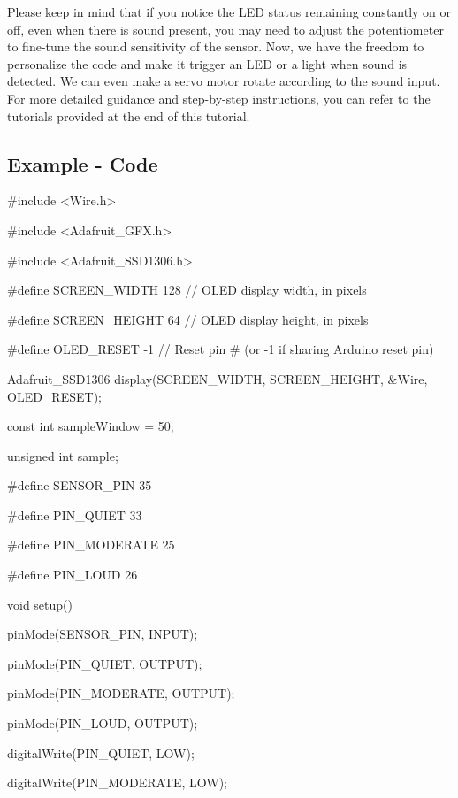 Please keep in mind that if you notice the LED status remaining constantly on or off, even when there is sound present, you may need to adjust the potentiometer to fine-tune the sound sensitivity of the sensor.
Now, we have the freedom to personalize the code and make it trigger an LED or a light when sound is detected. We can even make a servo motor rotate according to the sound input. For more detailed guidance and step-by-step instructions, you can refer to the tutorials provided at the end of this tutorial.


\subsection{Example - Code}

\begin{Arduino}
	#include <Wire.h>
	
	#include <Adafruit_GFX.h>
	
	#include <Adafruit_SSD1306.h>
	
	#define  SCREEN_WIDTH 128 // OLED display width, in pixels
	
	#define  SCREEN_HEIGHT 64 // OLED display height, in pixels
	
	#define  OLED_RESET   -1 // Reset pin # (or -1 if sharing Arduino reset pin)
	
	
	
	Adafruit_SSD1306 display(SCREEN_WIDTH, SCREEN_HEIGHT, &Wire, OLED_RESET);
	
	
	
	const int sampleWindow = 50;
	
	unsigned int sample;
	
	
	
	#define SENSOR_PIN 35
	
	#define PIN_QUIET 33
	
	#define PIN_MODERATE 25
	
	#define PIN_LOUD 26
	
	
	
	void setup(){
		
		pinMode(SENSOR_PIN, INPUT); 
		
		pinMode(PIN_QUIET, OUTPUT);
		
		pinMode(PIN_MODERATE, OUTPUT);
		
		pinMode(PIN_LOUD, OUTPUT);
		
		
		
		digitalWrite(PIN_QUIET, LOW);
		
		digitalWrite(PIN_MODERATE, LOW);
		
}
\end{Arduino}
